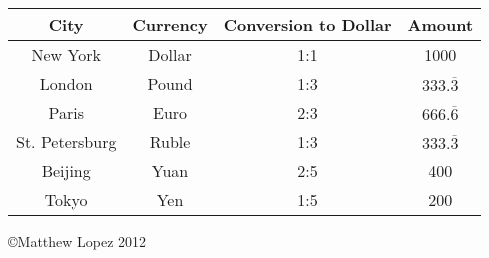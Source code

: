 \documentclass[12pt]{article}
\begin{document}
\begin{enumerate}
	\begin{tabular}{ | c | c | c | c | }
	\hline
	\bf{City} & \bf{Currency} & \bf{Conversion to Dollar} & \bf{Amount} \\ \hline \hline
	New York & Dollar & 1:1 & 1000 \\ \hline
	London & Pound & 1:3 & \( 333.\overline{3} \) \\ \hline
	Paris & Euro & 2:3 & \( 666.\overline{6} \) \\ \hline
	St. Petersburg & Ruble & 1:3 & \( 333.\overline{3} \) \\ \hline
	Beijing & Yuan & 2:5 & 400 \\ \hline
	Tokyo & Yen & 1:5 & 200 \\ \hline
	\hline
	\end{tabular}
\end{enumerate}


\copyright Matthew Lopez 2012
\end{document}
